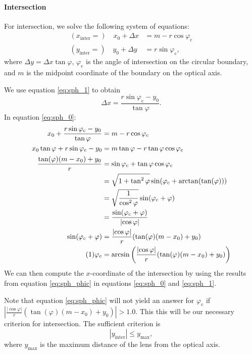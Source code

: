 \documentclass[12pt]{article}
\newcommand*{\tageq}{\refstepcounter{equation}\tag{\theequation}}
\newcommand{\abs}[1]{\left|#1\right|}
\begin{document}
\paragraph{Intersection} For intersection, we solve the following system of equations:
\begin{align}
  \label{eq:sph_0} (x_\text{inter} =)\quad x_0 + \Delta x & = m - r \cos\varphi_\text{c}\\
  \label{eq:sph_1} (y_\text{inter} =)\quad y_0 + \Delta y & = r \sin\varphi_\text{c},
\end{align}
where $\Delta y = \Delta x \tan{\varphi}$, $\varphi_\text{c}$ is the angle of
intersection on the circular boundary, and $m$ is the midpoint coordinate of the boundary
on the optical axis.

We use equation \eqref{eq:sph_1} to obtain
\begin{equation}\label{eq:sph_dx}
  \Delta x = \frac{r \sin\varphi_\text{c} - y_0}{\tan\varphi}.
\end{equation}
In equation \eqref{eq:sph_0}:
\begin{align*}
  x_0 + \frac{r \sin\varphi_\text{c} - y_0}{\tan\varphi}
    &= m - r \cos\varphi_\text{c}\\
  x_0 \tan\varphi + r \sin\varphi_\text{c} - y_0 
    &= m \tan\varphi - r \tan\varphi \cos\varphi_\text{c}\\
%
  \frac{\tan(\varphi)(m - x_0) + y_0}{r}
    & = \sin\varphi_\text{c} + \tan\varphi\cos\varphi_\text{c}\\
    & = \sqrt{1 + \tan^2\varphi} \sin(\varphi_\text{c} + \arctan(\tan(\varphi)))\\
    & = \sqrt{\frac{1}{\cos^2\varphi}} \sin(\varphi_\text{c} + \varphi)\\
    & = \frac{\sin(\varphi_\text{c} + \varphi)}{\abs{\cos\varphi}}\\
%
  \sin(\varphi_\text{c} + \varphi)
    & = \frac{\abs{\cos\varphi}}{r}(\tan(\varphi) (m - x_0) + y_0)\\
  \tageq \label{eq:sph_phic} \varphi_\text{c} 
    &= \arcsin\left(\frac{\abs{\cos\varphi}}{r}(\tan(\varphi) (m - x_0) + y_0)\right)
\end{align*}
We can then compute the $x$-coordinate of the intersection by using the results from
equation \eqref{eq:sph_phic} in equations \eqref{eq:sph_0} and \eqref{eq:sph_1}.

Note that equation \eqref{eq:sph_phic} will not yield an answer for $\varphi_\text{c}$ if
$\abs{\frac{\abs{\cos\varphi}}{r} (\tan(\varphi)(m - x_0) + y_0)} > 1.0$. This this will
be our necessary criterion for intersection. The sufficient criterion is
$$\abs{y_\text{inter}} \leq y_\text{max},$$
where $y_\text{max}$ is the maximum distance of the lens from the optical axis.
\end{document}
